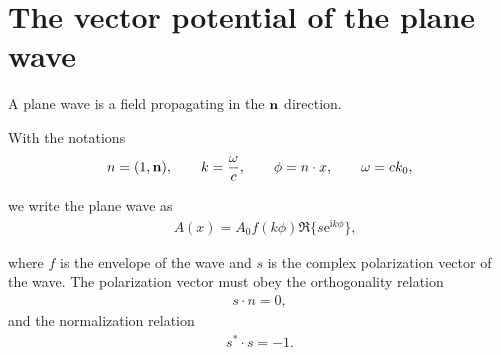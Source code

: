 

\section{The vector potential of the plane wave}

A plane wave is a field propagating in the ${\bf n}$ direction.

With the notations
\begin{align}
    n = (1,{\bf n}), \qquad k = \frac{\omega}{c}, \qquad \phi = n\cdot x, \qquad \omega = ck_0,
\end{align}

we write the plane wave as
\begin{align}
     & A(x) = A_0f(k\phi)\Re\{s {\mathrm e}^{{\mathrm i} k\phi}\},\label{eq:plane_wave}
\end{align}

where $f$ is the envelope of the wave and $s$ is the complex polarization vector of the wave. The polarization vector must obey the orthogonality relation
\begin{align}
    s\cdot n = 0,
\end{align}
and the normalization relation
\begin{align}
    s^* \cdot s = -1.
\end{align}
